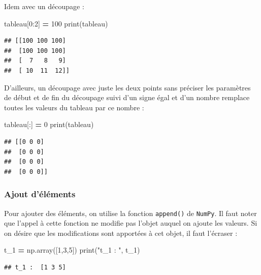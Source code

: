 \documentclass[12pt,]{book}
\newenvironment{Shaded}{\begin{snugshade}}{\end{snugshade}}
\newcommand{\DecValTok}[1]{\textcolor[rgb]{0.00,0.00,0.81}{#1}}
\newcommand{\StringTok}[1]{\textcolor[rgb]{0.31,0.60,0.02}{#1}}
\newcommand{\OperatorTok}[1]{\textcolor[rgb]{0.81,0.36,0.00}{\textbf{#1}}}
\newcommand{\BuiltInTok}[1]{#1}
\newcommand{\NormalTok}[1]{#1}
\numberwithin{equation}{section}
\numberwithin{countremarque}{section}
\begin{document}
Idem avec un découpage :

\begin{Shaded}
\begin{Highlighting}[]
\NormalTok{tableau[}\DecValTok{0}\NormalTok{:}\DecValTok{2}\NormalTok{] }\OperatorTok{=} \DecValTok{100}
\BuiltInTok{print}\NormalTok{(tableau)}
\end{Highlighting}
\end{Shaded}

\begin{lstlisting}
## [[100 100 100]
##  [100 100 100]
##  [  7   8   9]
##  [ 10  11  12]]
\end{lstlisting}

D'ailleurs, un découpage avec juste les deux points sans préciser les
paramètres de début et de fin du découpage suivi d'un signe égal et d'un
nombre remplace toutes les valeurs du tableau par ce nombre :

\begin{Shaded}
\begin{Highlighting}[]
\NormalTok{tableau[:] }\OperatorTok{=} \DecValTok{0}
\BuiltInTok{print}\NormalTok{(tableau)}
\end{Highlighting}
\end{Shaded}

\begin{lstlisting}
## [[0 0 0]
##  [0 0 0]
##  [0 0 0]
##  [0 0 0]]
\end{lstlisting}

\subsubsection{Ajout d'éléments}\label{ajout-delements-2}

Pour ajouter des éléments, on utilise la fonction \texttt{append()} de
\texttt{NumPy}. Il faut noter que l'appel à cette fonction ne modifie
pas l'objet auquel on ajoute les valeurs. Si on désire que les
modifications sont apportées à cet objet, il faut l'écraser :

\begin{Shaded}
\begin{Highlighting}[]
\NormalTok{t_1 }\OperatorTok{=}\NormalTok{ np.array([}\DecValTok{1}\NormalTok{,}\DecValTok{3}\NormalTok{,}\DecValTok{5}\NormalTok{])}
\BuiltInTok{print}\NormalTok{(}\StringTok{"t_1 : "}\NormalTok{, t_1)}
\end{Highlighting}
\end{Shaded}

\begin{lstlisting}
## t_1 :  [1 3 5]
\end{lstlisting}
\end{document}
